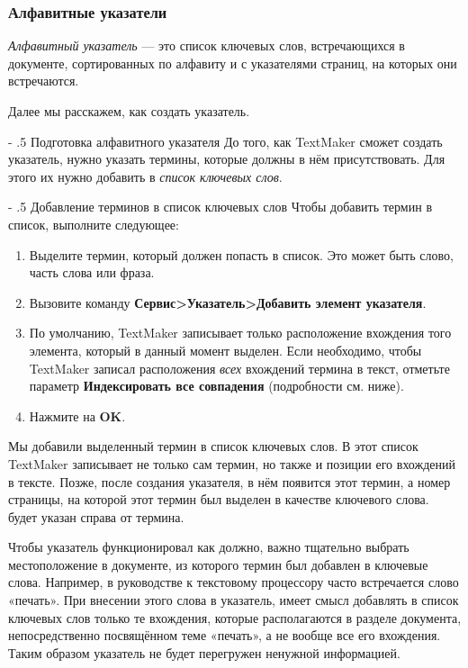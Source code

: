 ﻿\documentclass[a4paper,10pt]{article}
\makeatletter
\renewcommand\paragraph{%
   \@startsection{paragraph}{4}{0mm}%
      {-\baselineskip}%
      {.5\baselineskip}%
      {\normalfont\normalsize\bfseries}}
\makeatother
\begin{document}
\subsubsection{Алфавитные указатели}
\textit{Алфавитный указатель} — это список ключевых слов, встречающихся в документе, сортированных по алфавиту и с указателями страниц, на которых они встречаются.

Далее мы расскажем, как создать указатель.

\paragraph{Подготовка алфавитного указателя}
До того, как TextMaker сможет создать указатель, нужно указать термины, которые должны в нём присутствовать. Для этого их нужно добавить в \textit{список ключевых слов}.

\paragraph{Добавление терминов в список ключевых слов}
Чтобы добавить термин в список, выполните следующее:
\begin{enumerate}
 \item Выделите термин, который должен попасть в список. Это может быть слово, часть слова или фраза.
 \item Вызовите команду \textbf{Сервис>Указатель>Добавить элемент указателя}.
 \item По умолчанию, TextMaker записывает только расположение вхождения того элемента, который в данный	момент выделен. Если необходимо, чтобы TextMaker записал расположения \textit{всех} вхождений термина в текст, отметьте параметр \textbf{Индексировать все совпадения} (подробности см. ниже).
 \item Нажмите на \textbf{OK}.
\end{enumerate}

Мы добавили выделенный термин в список ключевых слов. В этот список TextMaker записывает не только сам термин, но также и позиции его вхождений в тексте. Позже, после создания указателя, в нём появится этот термин, а номер страницы, на которой этот термин был выделен в качестве ключевого слова. будет указан справа от термина.

Чтобы указатель функционировал как должно, важно тщательно выбрать местоположение в документе, из которого термин был добавлен в ключевые слова. Например, в руководстве к текстовому процессору часто встречается слово «печать». При внесении этого слова в указатель, имеет смысл добавлять в список ключевых слов только те вхождения, которые располагаются в разделе документа, непосредственно посвящённом теме «печать», а не вообще все его вхождения. Таким образом указатель не будет перегружен ненужной информацией.
\end{document}
